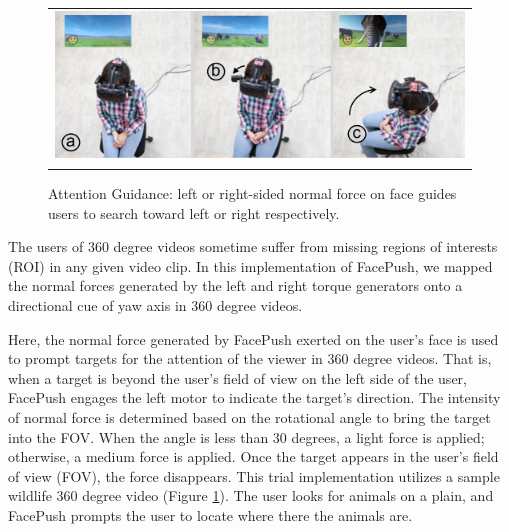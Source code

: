 \begin{figure}[h]
    \begin{center}
        \begin{tabular}{@{\hspace{0.1cm}}c}
            \includegraphics[width=1\linewidth]{figures/attention-guidance2}
        \end{tabular}
        \caption{Attention Guidance: left or right-sided normal force on face guides users to search toward left or right respectively.}
        \label{fig:attention-guidance}
    \end{center}
\end{figure}

The users of 360 degree videos sometime suffer from missing regions of interests (ROI) in any given video clip. In this implementation of FacePush, we mapped the normal forces generated by the left and right torque generators onto a directional cue of yaw axis in 360 degree videos. 

Here, the normal force generated by FacePush exerted on the user's face is used to prompt targets for the attention of the viewer in 360 degree videos. That is, when a target is beyond the user's field of view on the left side of the user, FacePush engages the left motor to indicate the target's direction. The intensity of normal force is determined based on the rotational angle to bring the target into the FOV. When the angle is less than 30 degrees, a light force is applied; otherwise, a medium force is applied. Once the target appears in the user's field of view (FOV), the force disappears. This trial implementation utilizes a sample wildlife 360 degree video (Figure \ref{fig:attention-guidance}). The user looks for animals on a plain, and FacePush prompts the user to locate where there the animals are.

